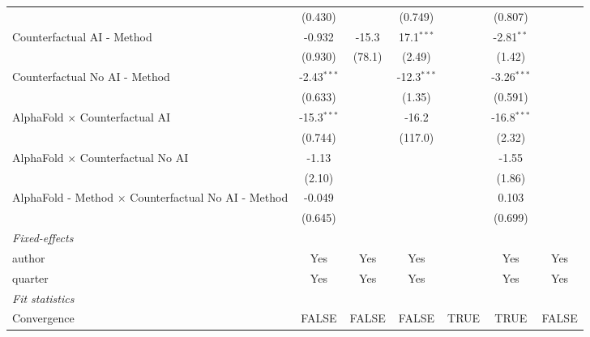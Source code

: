 \begin{tabular}{lcccccc}
                                                              & (0.430)       &         & (0.749)       &      & (0.807)       &   \\   
   Counterfactual AI - Method                                 & -0.932        & -15.3   & 17.1$^{***}$  &      & -2.81$^{**}$  &   \\   
                                                              & (0.930)       & (78.1)  & (2.49)        &      & (1.42)        &   \\   
   Counterfactual No AI - Method                              & -2.43$^{***}$ &         & -12.3$^{***}$ &      & -3.26$^{***}$ &   \\   
                                                              & (0.633)       &         & (1.35)        &      & (0.591)       &   \\   
   AlphaFold $\times$ Counterfactual AI                       & -15.3$^{***}$ &         & -16.2         &      & -16.8$^{***}$ &   \\   
                                                              & (0.744)       &         & (117.0)       &      & (2.32)        &   \\   
   AlphaFold $\times$ Counterfactual No AI                    & -1.13         &         &               &      & -1.55         &   \\   
                                                              & (2.10)        &         &               &      & (1.86)        &   \\   
   AlphaFold - Method $\times$ Counterfactual No AI - Method  & -0.049        &         &               &      & 0.103         &   \\   
                                                              & (0.645)       &         &               &      & (0.699)       &   \\   
   \midrule
   \emph{Fixed-effects}\\
   author                                                     & Yes           & Yes     & Yes           &      & Yes           & Yes\\  
   quarter                                                    & Yes           & Yes     & Yes           &      & Yes           & Yes\\  
   \midrule
   \emph{Fit statistics}\\
   Convergence                                                &FALSE          & FALSE   & FALSE         & TRUE & TRUE          & FALSE\\  

\end{tabular}
